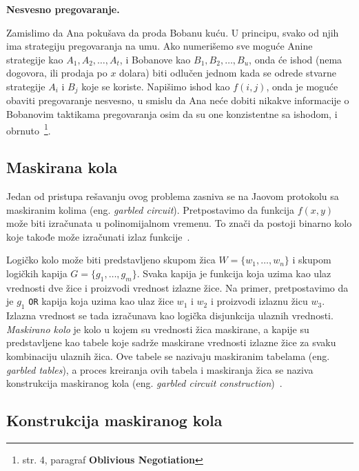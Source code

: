 \begin{example}
    \label{oblivious_negotiation}
    \textbf{Nesvesno pregovaranje.}
    
    Zamislimo da Ana pokušava da proda Bobanu kuću. U principu, svako od njih ima strategiju pregovaranja na umu. Ako numerišemo sve moguće Anine strategije kao $A_1, A_2, \ldots, A_t$, i Bobanove kao $B_1, B_2, \ldots, B_u$, onda će ishod (nema dogovora, ili prodaja po $x$ dolara) biti odlučen jednom kada se odrede stvarne strategije $A_i$ i $B_j$ koje se koriste. Napišimo ishod kao $f(i, j)$, onda je moguće obaviti pregovaranje nesvesno, u smislu da Ana neće dobiti nikakve informacije o Bobanovim taktikama pregovaranja osim da su one konzistentne sa ishodom, i obrnuto~\cite{yao1982protocols}\footnote{str. 4, paragraf \textbf{Oblivious Negotiation}}.
\end{example}

\subsection{Maskirana kola}

Jedan od pristupa rešavanju ovog problema zasniva se na Jaovom protokolu sa maskiranim kolima (eng. \textit{garbled circuit}). Pretpostavimo da funkcija $f(x, y)$ može biti izračunata u polinomijalnom vremenu. To znači da postoji binarno kolo koje takođe može izračunati izlaz funkcije~\cite{smart2016cryptography}. 

Logičko kolo može biti predstavljeno skupom žica $W = \{w_1,\ldots,w_n\}$ i skupom logičkih kapija $G = \{g_1,\ldots,g_m\}$. Svaka kapija je funkcija koja uzima kao ulaz vrednosti dve žice i proizvodi vrednost izlazne žice. Na primer, pretpostavimo da je $g_1$ \verb|OR| kapija koja uzima kao ulaz žice $w_1$ i $w_2$ i proizvodi izlaznu žicu $w_3$. Izlazna vrednost se tada izračunava kao logička disjunkcija ulaznih vrednosti.
 \textit{Maskirano kolo} je kolo u kojem su vrednosti žica maskirane, a kapije su predstavljene kao tabele koje sadrže maskirane vrednosti izlazne žice za svaku kombinaciju ulaznih žica. Ove tabele se nazivaju maskiranim tabelama (eng. \textit{garbled tables}), a proces kreiranja ovih tabela i maskiranja žica se naziva konstrukcija maskiranog kola (eng. \textit{garbled circuit construction})~\cite{smart2016cryptography}.

\subsection{Konstrukcija maskiranog kola}

